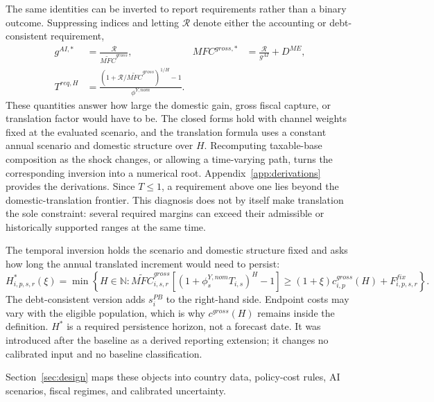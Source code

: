 The same identities can be inverted to report requirements rather than a binary outcome. Suppressing indices and letting $\mathcal R$ denote either the accounting or debt-consistent requirement,
\begin{align}
  g^{AI,*}
    &=\frac{\mathcal R}{\widetilde{MFC}^{gross}},
  &MFC^{gross,*}
    &=\frac{\mathcal R}{g^{AI}}+D^{ME},
    \label{eq:g_mfc_inversions_clean}\\
  T^{req,H}
    &=\frac{\left(1+\mathcal R/\widetilde{MFC}^{gross}\right)^{1/H}-1}
            {\phi^{Y,nom}}.
    \label{eq:translation_inversion_clean}
\end{align}
These quantities answer how large the domestic gain, gross fiscal capture, or translation factor would have to be. The closed forms hold with channel weights fixed at the evaluated scenario, and the translation formula uses a constant annual scenario and domestic structure over $H$. Recomputing taxable-base composition as the shock changes, or allowing a time-varying path, turns the corresponding inversion into a numerical root. Appendix~\ref{app:derivations} provides the derivations. Since $T\leq1$, a requirement above one lies beyond the domestic-translation frontier. This diagnosis does not by itself make translation the sole constraint: several required margins can exceed their admissible or historically supported ranges at the same time.

The temporal inversion holds the scenario and domestic structure fixed and asks how long the annual translated increment would need to persist:
\begin{equation}
  H^*_{i,p,s,r}(\xi)
  =\min\left\{
    H\in\mathbb N:
    \widetilde{MFC}^{gross}_{i,s,r}
    \left[\left(1+\phi^{Y,nom}_{s}T_{i,s}\right)^H-1\right]
    \geq(1+\xi)c^{gross}_{i,p}(H)+F^{fix}_{i,p,s,r}
  \right\}.
  \label{eq:hstar_clean}
\end{equation}
The debt-consistent version adds $s_i^{PB}$ to the right-hand side. Endpoint costs may vary with the eligible population, which is why $c^{gross}(H)$ remains inside the definition. $H^*$ is a required persistence horizon, not a forecast date. It was introduced after the baseline as a derived reporting extension; it changes no calibrated input and no baseline classification.

Section~\ref{sec:design} maps these objects into country data, policy-cost rules, AI scenarios, fiscal regimes, and calibrated uncertainty.
